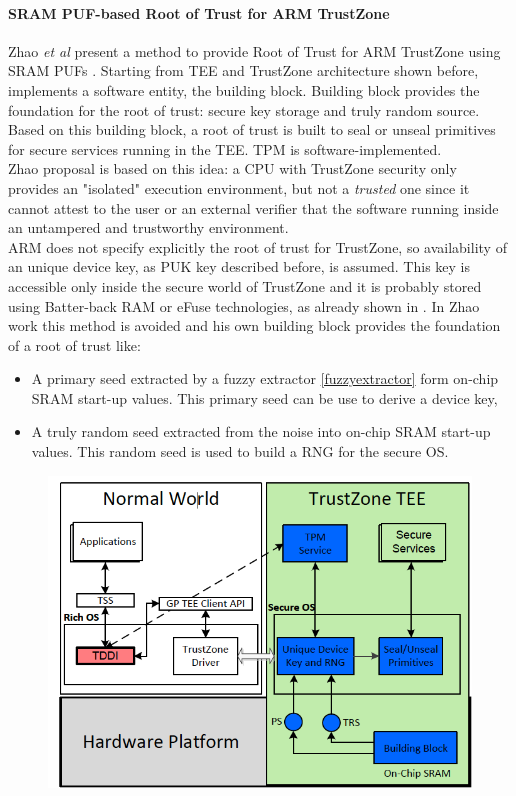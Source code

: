 \documentclass[../tesi.tex]{subfiles}
\begin{document}
{\paragraph{SRAM PUF-based Root of Trust for ARM TrustZone}
Zhao \emph{et al} present a method to provide Root of Trust for ARM TrustZone using SRAM PUFs \cite{zhao2014providing}. Starting from TEE and TrustZone architecture shown before, \cite{zhao2014providing} implements a software entity, the building block. Building block provides the foundation for the root of trust: secure key storage and truly random source. Based on this building block, a root of trust is built to seal or unseal primitives for secure services running in the TEE. TPM is software-implemented.\\
Zhao proposal is based on this idea: a CPU with TrustZone security only provides an "isolated" execution environment, but not a \emph{trusted} one since it cannot attest to the user or an external verifier that the software running inside an untampered and trustworthy environment. \\
ARM does not specify explicitly the root of trust for TrustZone, so availability of an unique device key, as PUK key described before, is assumed. This key is accessible only inside the secure world of TrustZone and it is probably stored using Batter-back RAM or eFuse technologies, as already shown in \cite{barbareschi2014advancing}. In Zhao work this method is avoided and his own building block provides the foundation of a root of trust like:
\begin{itemize}
\item A primary seed extracted by a fuzzy extractor \ref{fuzzyextractor} form on-chip SRAM start-up values. This primary seed can be use to derive a device key,
\item A truly random seed extracted from the noise into on-chip SRAM start-up values. This random seed is used to build a RNG for the secure OS. 
\end{itemize} 
\begin{figure}
\centering
\includegraphics[scale=0.40]{images/zhaotee.png}

\end{figure}}
\end{document}
